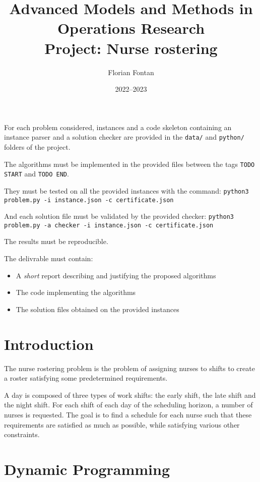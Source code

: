\documentclass[a4paper,twocolumn]{article}
\author{Florian Fontan}
\title{Advanced Models and Methods in Operations Research \\ Project: Nurse rostering}
\date{2022--2023}
\begin{document}
\maketitle

For each problem considered, instances and a code skeleton containing an instance parser and a solution checker are provided in the \texttt{data/} and \texttt{python/} folders of the project.

The algorithms must be implemented in the provided files between the tags \texttt{TODO START} and \texttt{TODO END}.

They must be tested on all the provided instances with the command:
\texttt{python3 problem.py -i instance.json -c certificate.json}

And each solution file must be validated by the provided checker:
\texttt{python3 problem.py -a checker -i instance.json -c certificate.json}

The results must be reproducible.

\bigskip

The delivrable must contain:
\begin{itemize}
  \item A \emph{short} report describing and justifying the proposed algorithms
  \item The code implementing the algorithms
  \item The solution files obtained on the provided instances
\end{itemize}

\section*{Introduction}

The nurse rostering problem is the problem of assigning nurses to shifts to create a roster satisfying some predetermined requirements.

A day is composed of three types of work shifts: the early shift, the late shift and the night shift. For each shift of each day of the scheduling horizon, a number of nurses is requested. The goal is to find a schedule for each nurse such that these requirements are satisfied as much as possible, while satisfying various other constraints.

\section{Dynamic Programming}
\end{document}
